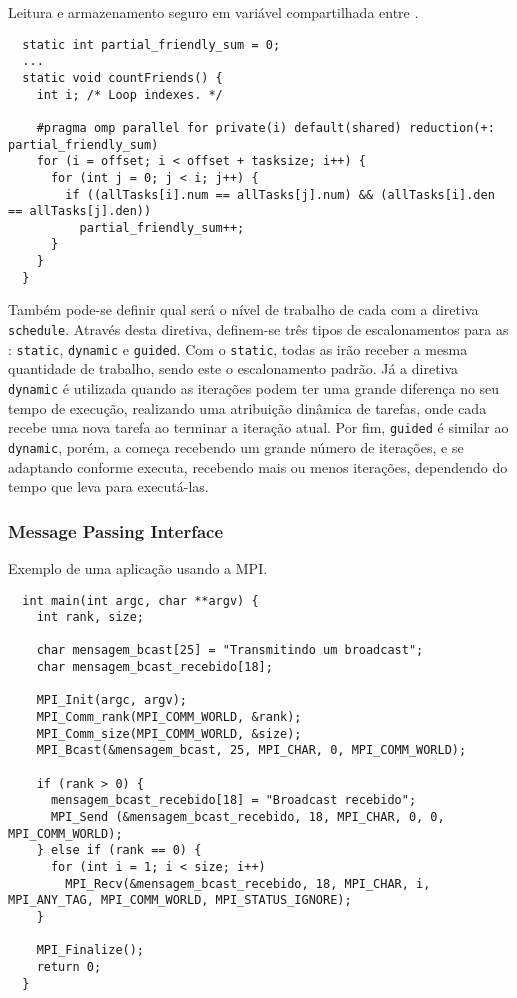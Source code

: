 \begin{listing}[tb]
\caption{Leitura e armazenamento seguro em variável compartilhada entre \threads.}
\label{lst:reductionloop}
\begin{verbatim}
  static int partial_friendly_sum = 0;
  ...
  static void countFriends() {
    int i; /* Loop indexes. */

    #pragma omp parallel for private(i) default(shared) reduction(+: partial_friendly_sum)
    for (i = offset; i < offset + tasksize; i++) {
      for (int j = 0; j < i; j++) {
        if ((allTasks[i].num == allTasks[j].num) && (allTasks[i].den == allTasks[j].den))
          partial_friendly_sum++;
      }
    }
  }
\end{verbatim}
\end{listing}

Também pode-se definir qual será o nível de trabalho de cada \thread com a diretiva \texttt{schedule}. Através desta diretiva, definem-se três tipos de escalonamentos para as \threads: \texttt{static}, \texttt{dynamic} e \texttt{guided}. Com o \texttt{static}, todas as \threads irão receber a mesma quantidade de trabalho, sendo este o escalonamento padrão. Já a diretiva \texttt{dynamic} é utilizada quando as iterações podem ter uma grande diferença no seu tempo de execução, realizando uma atribuição dinâmica de tarefas, onde cada \thread recebe uma nova tarefa ao terminar a iteração atual. Por fim, \texttt{guided} é similar ao \texttt{dynamic}, porém, a \thread começa recebendo um grande número de iterações, e se adaptando conforme executa, recebendo mais ou menos iterações, dependendo do tempo que leva para executá-las.

\subsubsection{Message Passing Interface}
\label{sec:mpi}

\begin{listing}[tb]
\caption{Exemplo de uma aplicação usando a MPI.}
\label{lst:programmpi}
\begin{verbatim}
  int main(int argc, char **argv) {
    int rank, size;

    char mensagem_bcast[25] = "Transmitindo um broadcast";
    char mensagem_bcast_recebido[18];

    MPI_Init(argc, argv);
    MPI_Comm_rank(MPI_COMM_WORLD, &rank);
    MPI_Comm_size(MPI_COMM_WORLD, &size);
    MPI_Bcast(&mensagem_bcast, 25, MPI_CHAR, 0, MPI_COMM_WORLD);

    if (rank > 0) {
      mensagem_bcast_recebido[18] = "Broadcast recebido";
      MPI_Send (&mensagem_bcast_recebido, 18, MPI_CHAR, 0, 0, MPI_COMM_WORLD);
    } else if (rank == 0) {
      for (int i = 1; i < size; i++)
        MPI_Recv(&mensagem_bcast_recebido, 18, MPI_CHAR, i, MPI_ANY_TAG, MPI_COMM_WORLD, MPI_STATUS_IGNORE);
    }

    MPI_Finalize();
    return 0;
  }
\end{verbatim}
\end{listing}

